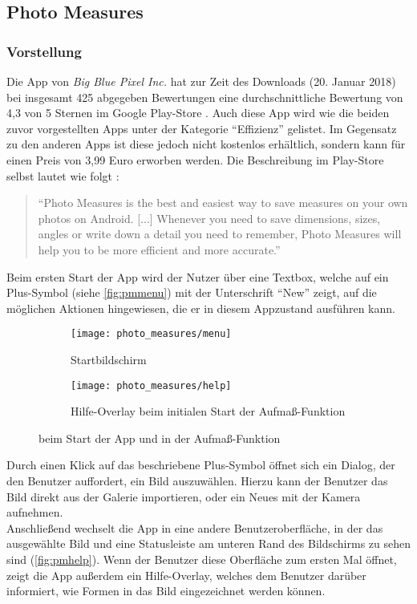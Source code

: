\subsection{Photo Measures}

\subsubsection{Vorstellung}
Die App \pm{} von \emph{Big Blue Pixel Inc.} hat zur Zeit des Downloads (20. Januar 2018) bei insgesamt 425 abgegeben Bewertungen eine durchschnittliche Bewertung von 4,3 von 5 Sternen im Google Play-Store \citep{PixelPM}.
Auch diese App wird wie die beiden zuvor vorgestellten Apps unter der Kategorie ``Effizienz'' gelistet.
Im Gegensatz zu den anderen Apps ist diese jedoch nicht kostenlos erhältlich, sondern kann für einen Preis von 3,99 Euro erworben werden.  
Die Beschreibung im Play-Store selbst lautet wie folgt :

\begin{quote}
  ``Photo Measures is the best and easiest way to save measures on your own photos on Android.
  [...] Whenever you need to save dimensions, sizes, angles or write down a detail you need to remember, Photo Measures will help you to be more efficient and more accurate.''
\end{quote}

\noindent
Beim ersten Start der App wird der Nutzer über eine Textbox, welche auf ein Plus-Symbol (siehe \autoref{fig:pmmenu}) mit der Unterschrift ``New'' zeigt, auf die möglichen Aktionen hingewiesen, die er in diesem Appzustand ausführen kann.

\begin{figure}[h]
  \centering
  \begin{subfigure}[t]{0.4\textwidth}
    \texttt{[image: photo\_measures/menu]}
    \caption{Startbildschirm}
    \label{fig:pmmenu}	
  \end{subfigure}
  \begin{subfigure}[t]{0.4\textwidth}
    \texttt{[image: photo\_measures/help]}
    \caption{Hilfe-Overlay beim initialen Start der Aufmaß-Funktion} 
    \label{fig:pmhelp}	
  \end{subfigure}
  \caption{\pm{} beim Start der App und in der Aufmaß-Funktion}
\end{figure}

\noindent
Durch einen Klick auf das beschriebene Plus-Symbol öffnet sich ein Dialog, der den Benutzer auffordert, ein Bild auszuwählen.
Hierzu kann der Benutzer das Bild direkt aus der Galerie importieren, oder ein Neues mit der Kamera aufnehmen. \\
Anschließend wechselt die App in eine andere Benutzeroberfläche, in der das ausgewählte Bild und eine Statusleiste am unteren Rand des Bildschirms zu sehen sind (\autoref{fig:pmhelp}).
Wenn der Benutzer diese Oberfläche zum ersten Mal öffnet, zeigt die App außerdem ein Hilfe-Overlay, welches dem Benutzer darüber informiert, wie Formen in das Bild eingezeichnet werden können.  \\

